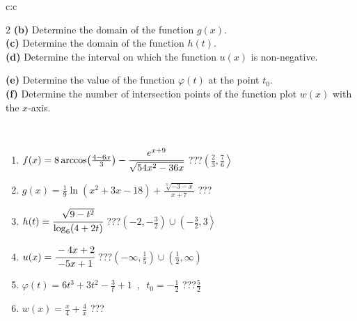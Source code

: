 \documentclass[10pt]{report}
\begin{document}
\begin{tabular}{c:c}
\begin{minipage}[c][104.5mm][t]{0.5\linewidth}
\begin{center}
\begin{minipage}{0.95\linewidth}
\begin{center}
{\begin{multicols}{2}
\textbf{(b)} Determine the domain of the function \(g(x)\). \\[1mm]
\textbf{(c)} Determine the domain of the function \(h(t)\). \\[1mm]
\textbf{(d)} Determine the interval on which the function \(u(x)\) is non-negative. \par \columnbreak
\textbf{(e)} Determine the value of the function \(\varphi(t)\) at the point \(t_0\). \\[1mm]
\textbf{(f)} Determine the number of intersection points of the function plot \(w(x)\) with the \(x\)-axis. \\[1mm]
\end{multicols}
}
\end{center}
\end{minipage}
\\[4mm]
\begin{minipage}{0.79\linewidth}
\begin{center}
\begin{varwidth}{\linewidth}
\begin{enumerate}
\small
\item $f(x) = 8\arccos\!\left( \frac{4-6x}{3} \right) - \cfrac{e^{x+9}}{\sqrt{54x^2-36x}}$\quad \dotfill\; ???\;\dotfill \quad $\left(\frac{2}{3} , \frac{7}{6}\right\rangle$
\item $g(x) = \frac{1}{9} \ln{\!(x^2+3x-18)}+\frac{\sqrt[3]{-3-x}}{x+7}$\quad \dotfill\; ???\;\dotfill {}
\item $h(t) = \cfrac{\sqrt{9-t^2}}{\log_6(4+2t)}$\quad \dotfill\; ???\;\dotfill \quad $\left(-2 , -\frac{3}{2}\right)\cup\left(-\frac{3}{2} , 3\right\rangle$
\item $u(x) = \cfrac{-4x+2}{-5x+1}$\quad \dotfill\; ???\;\dotfill \quad $\left(-\infty , \frac{1}{5}\right)\cup\left(\frac{1}{2} , \infty\right)$
\item $\varphi(t) = 6t^3+3t^2-\frac{3}{t}+1 \enspace , \enspace t_0=-\frac{1}{2}$\quad \dotfill\; ???\;\dotfill \quad $\frac{5}{2}$
\item $w(x) = \frac{x}{4}+\frac{4}{x}$\quad \dotfill\; ???\;\dotfill {}
\end{enumerate}
\end{varwidth}
\end{center}
\end{minipage}
\begin{minipage}{0.20\linewidth}
\begin{center}

\end{center}
\end{minipage}
\end{center}
\end{minipage}
\end{tabular}
\end{document}
